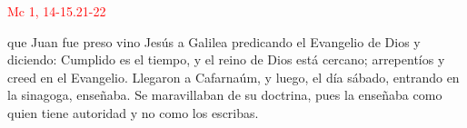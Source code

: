 \hfill\textcolor{red}{Mc 1, 14-15.21-22}

 que Juan fue preso vino Jesús a Galilea predicando el Evangelio de Dios y diciendo: Cumplido es el tiempo, y el reino de Dios está cercano;
arrepentíos y creed en el Evangelio. Llegaron a Cafarnaúm, y luego, el día sábado, entrando en la sinagoga, enseñaba. Se maravillaban de su doctrina,
pues la enseñaba como quien tiene autoridad y no como los escribas.
